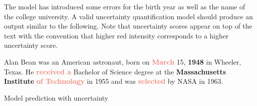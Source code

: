 The model has introduced some errors for the birth year as well as the name of the college university. A valid uncertainty quantification model should produce an output similar to the following. Note that uncertainty scores appear on top of the text with the convention that higher red intensity corresponds to a higher uncertainty score.

\epigraph{
Alan Bean was an American astronaut, born on \textcolor{Salmon}{\textbf{March}} 15, \textcolor{BrickRed}{\textbf{1948}} in Wheeler, Texas. He \textcolor{Salmon}{\textbf{received a}} Bachelor of Science degree at the \textcolor{BrickRed}{\textbf{Massachusetts Institute}}  \textcolor{Salmon}{\textbf{ of Technology}} in 1955 and was \textcolor{Salmon}{\textbf{selected}} by NASA in 1963.
}{Model prediction with uncertainty}




